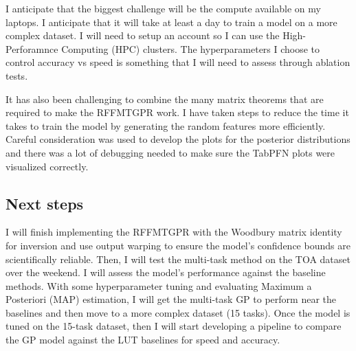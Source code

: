 \documentclass[11pt]{article}
\begin{document}
I anticipate that the biggest challenge will be the compute available on my laptops. I anticipate that it will take at least a day to train a model on a more complex dataset. I will need to setup an account so I can use the High-Perforamnce Computing (HPC) clusters. The hyperparameters I choose to control accuracy vs speed is something that I will need to assess through ablation tests.

It has also been challenging to combine the many matrix theorems that are required to make the RFFMTGPR work. I have taken steps to reduce the time it takes to train the model by generating the random features more efficiently. Careful consideration was used to develop the plots for the posterior distributions and there was a lot of debugging needed to make sure the TabPFN plots were visualized correctly.



\subsection{Next steps}
\label{sec:next-steps}

I will finish implementing the RFFMTGPR with the Woodbury matrix identity for inversion and use output warping to ensure the model's confidence bounds are scientifically reliable. Then, I will test the multi-task method on the TOA dataset over the weekend. I will assess the model's performance against the baseline methods. With some hyperparameter tuning and evaluating Maximum a Posteriori (MAP) estimation, I will get the multi-task GP to perform near the baselines and then move to a more complex dataset (15 tasks). Once the model is tuned on the 15-task dataset, then I will start developing a pipeline to compare the GP model against the LUT baselines for speed and accuracy.
\end{document}
